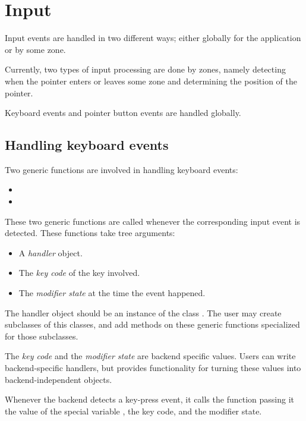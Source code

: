 \chapter{Input}
\label{chap-input-events}

Input events are handled in two different ways; either globally for
the application or by some zone.  

Currently, two types of input processing are done by zones, namely
detecting when the pointer enters or leaves some zone
 and determining the position of the
pointer. 

Keyboard events and pointer button events are handled globally.

\section{Handling keyboard events}

Two generic functions are involved in handling keyboard events:

\begin{itemize}
\item {}
\item {}
\end{itemize}

These two generic functions are called whenever the corresponding
input event is detected.  These functions take tree arguments:

\begin{itemize}
\item A \emph{handler} object.
\item The \emph{key code} of the key involved.
\item The \emph{modifier state} at the time the event happened.
\end{itemize}

The handler object should be an instance of the class
.  The user may create subclasses of this classes,
and add methods on these generic functions specialized for those
subclasses.

The \emph{key code} and the \emph{modifier state} are backend specific
values.  Users can write backend-specific handlers, but \clim{}
provides functionality for turning these values into
backend-independent objects.

Whenever the backend detects a key-press event, it calls the function
 passing it the value of the special variable
, the key code, and the modifier state. 

